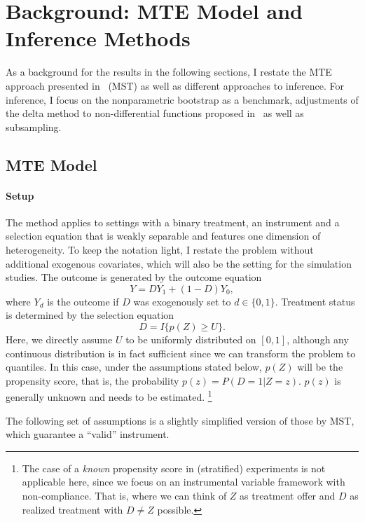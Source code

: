 \documentclass[12pt,a4paper,english]{article} %
\numberwithin{equation}{section}
\theoremstyle{definition}
\theoremstyle{remark}
\theoremstyle{plain}
\begin{document}
\section{Background: MTE Model and Inference Methods}\label{sec:general_mte}
As a background for the results in the following sections, I restate the MTE approach presented in~\cite{mogstad2018using} (MST) as well as different approaches to inference.
For inference, I focus on the nonparametric bootstrap as a benchmark, adjustments of the delta method to non-differential functions proposed in~\cite{fang2019infdirdiff} as well as subsampling.

\subsection{MTE Model}
\paragraph{Setup}
The method applies to settings with a binary treatment, an instrument and a selection equation that is weakly separable and features one dimension of heterogeneity.
To keep the notation light, I restate the problem without additional exogenous covariates, which will also be the setting for the simulation studies.
The outcome is generated by the outcome equation
\begin{equation}\label{eq:outcome}
  Y = DY_1 + (1-D) Y_0,
\end{equation}
where $Y_d$ is the outcome if $D$ was exogenously set to $d\in\{0,1\}$.
Treatment status is determined by the selection equation
\begin{equation}\label{eq:selection}
  D = I\{p(Z) \geq U\}.
\end{equation}
Here, we directly assume $U$ to be uniformly distributed on $[0,1]$, although any continuous distribution is in fact sufficient since we can transform the problem to quantiles.
In this case, under the assumptions stated below, $p(Z)$ will be the propensity score, that is, the probability $p(z) = P(D=1|Z=z)$.
$p(z)$ is generally unknown and needs to be estimated.
\footnote{The case of a \textit{known} propensity score in (stratified) experiments is not applicable here, since we focus on an instrumental variable framework with non-compliance.
That is, where we can think of $Z$ as treatment offer and $D$ as realized treatment with $D\neq Z$ possible.}

The following set of assumptions is a slightly simplified version of those by MST, which guarantee a ``valid'' instrument.
\end{document}
